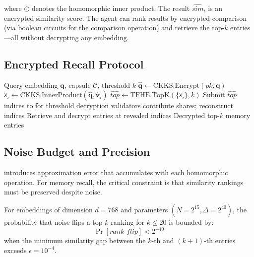 where $\odot$ denotes the \CKKS{} homomorphic inner product. The result $\widehat{\textit{sim}}_i$ is an encrypted similarity score. The agent can rank results by encrypted comparison (via \TFHE{} boolean circuits for the comparison operation) and retrieve the top-$k$ entries---all without decrypting any embedding.

\subsection{Encrypted Recall Protocol}

\begin{algorithm}
\caption{FHE-Encrypted Memory Recall}
\begin{algorithmic}[1]
\REQUIRE Query embedding $\mathbf{q}$, capsule $\mathcal{C}$, threshold $k$
\STATE $\hat{\mathbf{q}} \leftarrow \text{CKKS.Encrypt}(pk, \mathbf{q})$
    \STATE $\hat{s}_i \leftarrow \text{CKKS.InnerProduct}(\hat{\mathbf{q}}, \hat{\mathbf{v}}_i)$
\ENDFOR
\STATE $\hat{\textit{top}} \leftarrow \text{TFHE.TopK}(\{\hat{s}_i\}, k)$ 
\STATE Submit $\hat{\textit{top}}$ indices to \TChain{} for threshold decryption
\STATE \TChain{} validators contribute shares; reconstruct indices
\STATE Retrieve and decrypt entries at revealed indices
\RETURN Decrypted top-$k$ memory entries
\end{algorithmic}
\end{algorithm}

\subsection{Noise Budget and Precision}

\CKKS{} introduces approximation error that accumulates with each homomorphic operation. For memory recall, the critical constraint is that similarity rankings must be preserved despite noise.

\begin{proposition}
For embeddings of dimension $d = 768$ and \CKKS{} parameters $(N = 2^{15}, \Delta = 2^{40})$, the probability that noise flips a top-$k$ ranking for $k \leq 20$ is bounded by:
\begin{equation}
\Pr[\textit{rank flip}] < 2^{-40}
\end{equation}
when the minimum similarity gap between the $k$-th and $(k+1)$-th entries exceeds $\epsilon = 10^{-4}$.
\end{proposition}

